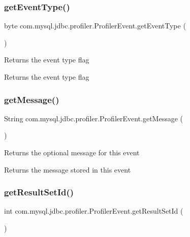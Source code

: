 \subsubsection{\texorpdfstring{get\+Event\+Type()}{getEventType()}}
{\footnotesize\ttfamily byte com.\+mysql.\+jdbc.\+profiler.\+Profiler\+Event.\+get\+Event\+Type (\begin{DoxyParamCaption}{ }\end{DoxyParamCaption})}

Returns the event type flag

\begin{DoxyReturn}{Returns}
the event type flag 
\end{DoxyReturn}
\mbox{\label{classcom_1_1mysql_1_1jdbc_1_1profiler_1_1_profiler_event_a67c7d65e3ace6062a69cdab99f466b3c}} 
\subsubsection{\texorpdfstring{get\+Message()}{getMessage()}}
{\footnotesize\ttfamily String com.\+mysql.\+jdbc.\+profiler.\+Profiler\+Event.\+get\+Message (\begin{DoxyParamCaption}{ }\end{DoxyParamCaption})}

Returns the optional message for this event

\begin{DoxyReturn}{Returns}
the message stored in this event 
\end{DoxyReturn}
\mbox{\label{classcom_1_1mysql_1_1jdbc_1_1profiler_1_1_profiler_event_ab2278ad9e42c2abcb5f723cb0fe79acc}} 
\subsubsection{\texorpdfstring{get\+Result\+Set\+Id()}{getResultSetId()}}
{\footnotesize\ttfamily int com.\+mysql.\+jdbc.\+profiler.\+Profiler\+Event.\+get\+Result\+Set\+Id (\begin{DoxyParamCaption}{ }\end{DoxyParamCaption})}

